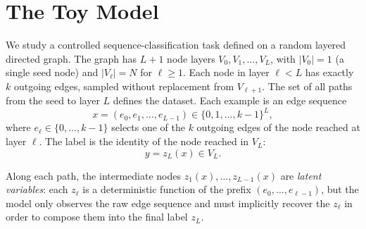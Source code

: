 %

\section{The Toy Model}
\label{sec:toy-model}

We study a controlled sequence-classification task defined on a random layered
directed graph. The graph has $L+1$ node layers $V_0, V_1, \dots, V_L$, with
$|V_0|=1$ (a single seed node) and $|V_\ell| = N$ for $\ell\geq 1$. Each node in
layer $\ell < L$ has exactly $k$ outgoing edges, sampled without replacement
from $V_{\ell+1}$. The set of all paths from the seed to layer $L$ defines the
dataset. Each example is an edge sequence
\begin{equation*}
    x = (e_0, e_1, \dots, e_{L-1}) \in \{0, 1, \dots, k-1\}^{L},
\end{equation*}
where $e_\ell \in \{0, \dots, k-1\}$ selects one of the $k$ outgoing edges of
the node reached at layer $\ell$. The label is the identity of the node reached
in $V_L$:
\begin{equation*}
    y = z_L(x) \in V_L.
\end{equation*}

Along each path, the intermediate nodes $z_1(x), \dots, z_{L-1}(x)$ are
\emph{latent variables}: each $z_\ell$ is a deterministic function of the
prefix $(e_0, \dots, e_{\ell-1})$, but the model only observes the raw edge
sequence and must implicitly recover the $z_\ell$ in order to compose them
into the final label $z_L$.

